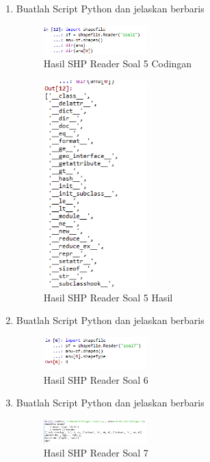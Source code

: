\begin{enumerate}
    \item Buatlah Script Python dan jelaskan berbaris
    
    \hfill\break
    \begin{figure}[H]
		\includegraphics[width=4cm]{figures/1174012/3/5.png}
		\centering
		\caption{Hasil SHP Reader Soal 5 Codingan}
    \end{figure}

    \hfill\break
    \begin{figure}[H]
		\includegraphics[width=4cm]{figures/1174012/3/5ku.png}
		\centering
		\caption{Hasil SHP Reader Soal 5 Hasil}
    \end{figure}
    
    \item Buatlah Script Python dan jelaskan berbaris
    
    \hfill\break
    \begin{figure}[H]
		\includegraphics[width=4cm]{figures/1174012/3/6.png}
		\centering
		\caption{Hasil SHP Reader Soal 6}
    \end{figure}

    \item Buatlah Script Python dan jelaskan berbaris
    
    \hfill\break
    \begin{figure}[H]
		\includegraphics[width=4cm]{figures/1174012/3/7.png}
		\centering
		\caption{Hasil SHP Reader Soal 7}
    \end{figure}


\end{enumerate}
